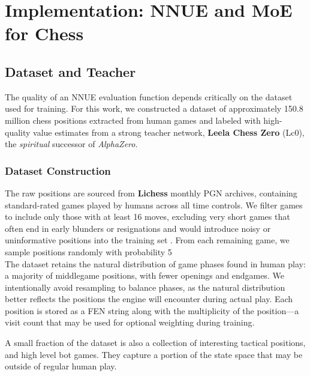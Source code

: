 \chapter{Implementation: NNUE and MoE for Chess}












\section{Dataset and Teacher}

The quality of an NNUE evaluation function depends critically on the dataset used for training. For this work, we constructed a dataset of approximately 150.8 million chess positions extracted from human games and labeled with high-quality value estimates from a strong teacher network, \textbf{Leela Chess Zero} (Lc0), the \emph{spiritual} successor of \emph{AlphaZero}.


\subsection{Dataset Construction}

The raw positions are sourced from \textbf{Lichess} monthly PGN archives, containing standard-rated games played by humans across all time controls. We filter games to include only those with at least 16 moves, excluding very short games that often end in early blunders or resignations and would introduce noisy or uninformative positions into the training set . From each remaining game, we sample positions randomly with probability 5\\%

The dataset retains the natural distribution of game phases found in human play: a majority of middlegame positions, with fewer openings and endgames. We intentionally avoid resampling to balance phases, as the natural distribution better reflects the positions the engine will encounter during actual play. Each position is stored as a FEN string along with the multiplicity of the position---a visit count that may be used for optional weighting during training.

A small fraction of the dataset is also a collection of interesting tactical positions, and high level bot games. They capture a portion of the state space that may be outside of regular human play.


